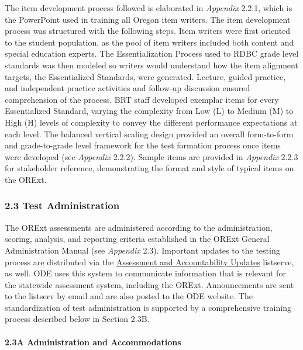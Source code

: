 \documentclass[]{article}
\let\oldparagraph\paragraph
\renewcommand{\paragraph}[1]{\oldparagraph{#1}\mbox{}}
\begin{document}
The item development process followed is elaborated in \emph{Appendix}
2.2.1, which is the PowerPoint used in training all Oregon item writers.
The item development process was structured with the following steps.
Item writers were first oriented to the student population, as the pool
of item writers included both content and special education experts. The
Essentialization Process used to RDBC grade level standards was then
modeled so writers would understand how the item alignment targets, the
Essentialized Standards, were generated. Lecture, guided practice, and
independent practice activities and follow-up discussion ensured
comprehension of the process. BRT staff developed exemplar items for
every Essentialized Standard, varying the complexity from Low (L) to
Medium (M) to High (H) levels of complexity to convey the different
performance expectations at each level. The balanced vertical scaling
design provided an overall form-to-form and grade-to-grade level
framework for the test formation process once items were developed (see
\emph{Appendix} 2.2.2). Sample items are provided in \emph{Appendix}
2.2.3 for stakeholder reference, demonstrating the format and style of
typical items on the ORExt.

\subsubsection{2.3 Test Administration}\label{test-administration}

The ORExt assessments are administered according to the administration,
scoring, analysis, and reporting criteria established in the ORExt
General Administration Manual (see \emph{Appendix} 2.3). Important
updates to the testing process are distributed via the
\color{link}\href{http://www.oregon.gov/ode/educator-resources/assessment/Pages/Assessment-and-Accountability-Update.aspx}{Assessment
and Accountability Updates} \color{black} listserve, as well. ODE uses
this system to communicate information that is relevant for the
statewide assessment system, including the ORExt. Announcements are sent
to the listserv by email and are also posted to the ODE website. The
standardization of test administration is supported by a comprehensive
training process described below in Section 2.3B.

\paragraph{2.3A Administration and
Accommodations}\label{a-administration-and-accommodations}
\end{document}

